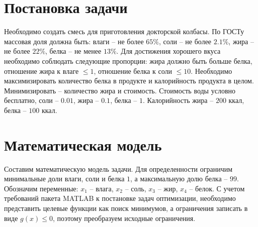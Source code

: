 \section{Постановка задачи}

Необходимо создать смесь для приготовления докторской колбасы.
По ГОСТу массовая доля должна быть: влаги – не более $65\%$, соли – не более $2.1\%$, жира – не более $22\%$, белка – не менее $13\%$.
Для достижения хорошего вкуса необходимо соблюдать следующие пропорции: жира должно быть больше белка, отношение жира к влаге $\leq 1$, отношение белка к соли $\leq 10$.
Необходимо максимизировать количество белка в продукте и калорийность продукта в целом. Минимизировать – количество жира и стоимость.
Стоимость воды условно бесплатно, соли – $0.01$, жира – $0.1$, белка – $1$. Калорийность жира – $200$ ккал, белка – $100$ ккал.

\newpage

\section{Математическая модель}

\noindent Составим математическую модель задачи. Для определенности ограничим минимальные доли влаги, соли и белка $1$, а максимальную долю белка -- $99$. Обозначим переменные: $x_1$ – влага, $x_2$ – соль, $x_3$ – жир, $x_4$ – белок. С учетом требований пакета MATLAB к постановке задач оптимизации, необходимо представить целевые функции как поиск минимумов, а ограничения записать в виде $g(x) \leq 0$, поэтому преобразуем исходные ограничения.

